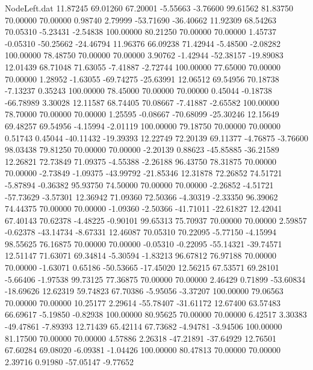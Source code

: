 \begin{filecontents}{NodeLeft.dat}
  11.87245   69.01260   67.20001    -5.55663   -3.76600   99.61562   81.83750   70.00000   70.00000    0.98740    2.79999  -53.71690  -36.40662
  11.92309   68.54263   70.05310    -5.23431   -2.54838  100.00000   80.21250   70.00000   70.00000    1.45737   -0.05310  -50.25662  -24.46794
  11.96376   66.09238   71.42944    -5.48500   -2.08282  100.00000   78.48750   70.00000   70.00000    3.90762   -1.42944  -52.38157  -19.89083
  12.01439   68.71048   71.63055    -7.41887   -2.72744  100.00000   77.65000   70.00000   70.00000    1.28952   -1.63055  -69.74275  -25.63991
  12.06512   69.54956   70.18738    -7.13237    0.35243  100.00000   78.45000   70.00000   70.00000    0.45044   -0.18738  -66.78989    3.30028
  12.11587   68.74405   70.08667    -7.41887   -2.65582  100.00000   78.70000   70.00000   70.00000    1.25595   -0.08667  -70.68099  -25.30246
  12.15649   69.48257   69.54956    -4.15994   -2.01119  100.00000   79.18750   70.00000   70.00000    0.51743    0.45044  -40.11432  -19.39393
  12.22749   72.20139   69.11377    -4.76875   -3.76600   98.03438   79.81250   70.00000   70.00000   -2.20139    0.88623  -45.85885  -36.21589
  12.26821   72.73849   71.09375    -4.55388   -2.26188   96.43750   78.31875   70.00000   70.00000   -2.73849   -1.09375  -43.99792  -21.85346
  12.31878   72.26852   74.51721    -5.87894   -0.36382   95.93750   74.50000   70.00000   70.00000   -2.26852   -4.51721  -57.73629   -3.57301
  12.36942   71.09360   72.50366    -4.30319   -2.33350   96.39062   74.44375   70.00000   70.00000   -1.09360   -2.50366  -41.71011  -22.61827
  12.42041   67.40143   70.62378    -4.48225   -0.90101   99.65313   75.70937   70.00000   70.00000    2.59857   -0.62378  -43.14734   -8.67331
  12.46087   70.05310   70.22095    -5.77150   -4.15994   98.55625   76.16875   70.00000   70.00000   -0.05310   -0.22095  -55.14321  -39.74571
  12.51147   71.63071   69.34814    -5.30594   -1.83213   96.67812   76.97188   70.00000   70.00000   -1.63071    0.65186  -50.53665  -17.45020
  12.56215   67.53571   69.28101    -5.66406   -1.97538   99.73125   77.36875   70.00000   70.00000    2.46429    0.71899  -53.60834  -18.69626
  12.62319   59.74823   67.70386    -5.95056   -3.37207  100.00000   79.06563   70.00000   70.00000   10.25177    2.29614  -55.78407  -31.61172
  12.67400   63.57483   66.69617    -5.19850   -0.82938  100.00000   80.95625   70.00000   70.00000    6.42517    3.30383  -49.47861   -7.89393
  12.71439   65.42114   67.73682    -4.94781   -3.94506  100.00000   81.17500   70.00000   70.00000    4.57886    2.26318  -47.21891  -37.64929
  12.76501   67.60284   69.08020    -6.09381   -1.04426  100.00000   80.47813   70.00000   70.00000    2.39716    0.91980  -57.05147   -9.77652

\end{filecontents}

